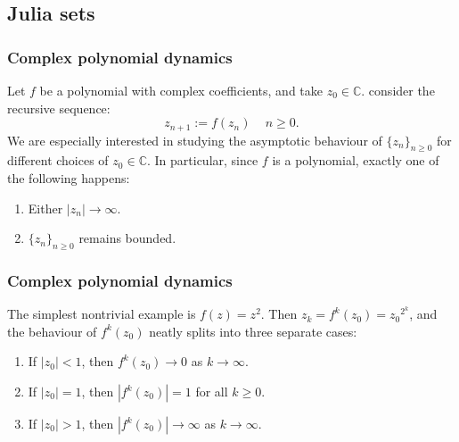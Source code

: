 \documentclass{beamer} %
\theoremstyle{definition} %
\newcommand{\Cplx}{\mathbb{C}}
\begin{document}

\subsection{Julia sets}

\begin{frame}\frametitle{Complex polynomial dynamics}
    Let $f$ be a polynomial with complex coefficients, and take
    $z_0 \in \Cplx$. consider the recursive sequence:
    \begin{equation*}
        z_{n+1} := f(z_n)\,\quad n\geq 0.
    \end{equation*}
    We are especially interested in studying the asymptotic behaviour of $\{z_n\}_{n\geq 0}$
    for different choices of $z_0 \in \Cplx$. In particular, since $f$ is a polynomial, exactly one of the following happens:
    \begin{enumerate}
        \item{} Either $|z_n| \to\infty$.
        \item{} $\{z_n\}_{n\geq 0}$ remains bounded.
    \end{enumerate}
\end{frame}

\begin{frame}\frametitle{Complex polynomial dynamics}
    The simplest nontrivial example is $f(z) = z^2$. Then $z_k = f^k(z_0) = {z_0}^{2^k}$, and the behaviour
    of $f^{k}(z_0)$ neatly splits into three separate cases:
    \begin{enumerate}
        \item{} If $|z_0| < 1$, then $f^k(z_0)\to 0$ as $k\to\infty$.
        \item{} If $|z_0| = 1$, then $|f^k(z_0)| = 1$ for all $k\geq 0$.
        \item{} If $|z_0| > 1$, then $|f^k(z_0)| \to \infty$ as $k\to\infty$.
    \end{enumerate}
\end{frame}
\end{document}
